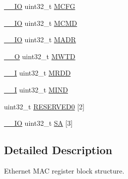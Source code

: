 \begin{DoxyCompactItemize}
\item 
\hyperlink{core__cm3_8h_aec43007d9998a0a0e01faede4133d6be}{\-\_\-\-\_\-\-I\-O} uint32\-\_\-t \hyperlink{structENET__MAC__T_a1e733caa47928bbd88205c10549db3b6}{M\-C\-F\-G}
\item 
\hyperlink{core__cm3_8h_aec43007d9998a0a0e01faede4133d6be}{\-\_\-\-\_\-\-I\-O} uint32\-\_\-t \hyperlink{structENET__MAC__T_af5015dd00c915a85f7aa387444349f59}{M\-C\-M\-D}
\item 
\hyperlink{core__cm3_8h_aec43007d9998a0a0e01faede4133d6be}{\-\_\-\-\_\-\-I\-O} uint32\-\_\-t \hyperlink{structENET__MAC__T_afc17c49a8ba00a4a4db6dc0b87d949b7}{M\-A\-D\-R}
\item 
\hyperlink{core__cm3_8h_a7e25d9380f9ef903923964322e71f2f6}{\-\_\-\-\_\-\-O} uint32\-\_\-t \hyperlink{structENET__MAC__T_a588ac0beb769e9cabb7039582625a3e0}{M\-W\-T\-D}
\item 
\hyperlink{core__cm3_8h_af63697ed9952cc71e1225efe205f6cd3}{\-\_\-\-\_\-\-I} uint32\-\_\-t \hyperlink{structENET__MAC__T_a98a3f303ec4276150d3d4b8586f2a71d}{M\-R\-D\-D}
\item 
\hyperlink{core__cm3_8h_af63697ed9952cc71e1225efe205f6cd3}{\-\_\-\-\_\-\-I} uint32\-\_\-t \hyperlink{structENET__MAC__T_a6d107736b77b59d7188fb6faa04ea549}{M\-I\-N\-D}
\item 
uint32\-\_\-t \hyperlink{structENET__MAC__T_a6e6d5f331b8f5ab0012d265d0a1ff6b1}{R\-E\-S\-E\-R\-V\-E\-D0} \mbox{[}2\mbox{]}
\item 
\hyperlink{core__cm3_8h_aec43007d9998a0a0e01faede4133d6be}{\-\_\-\-\_\-\-I\-O} uint32\-\_\-t \hyperlink{structENET__MAC__T_a25214ef3698b23b87fea95b7158a11ad}{S\-A} \mbox{[}3\mbox{]}
\end{DoxyCompactItemize}


\subsection{Detailed Description}
Ethernet M\-A\-C register block structure. 

